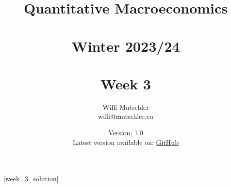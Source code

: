 
\newif\ifDisplaySolutions%


\title{Quantitative Macroeconomics\\~\\Winter 2023/24\\~\\Week 3}
\author{Willi Mutschler\\willi@mutschler.eu}
\date{Version: 1.0\\Latest version available on: \href{https://github.com/wmutschl/Quantitative-Macroeconomics/releases/latest/download/week_3.pdf}{GitHub}}
\maketitle\thispagestyle{empty}

\newpage
{}[week_3_solution]
\tableofcontents\thispagestyle{empty}\newpage

\setcounter{page}{1}
\newpage
\newpage
\newpage
\newpage
\printbibliography
\newpage

\ifDisplaySolutions
\newpage
\appendix
\section{Solutions}

\fi
